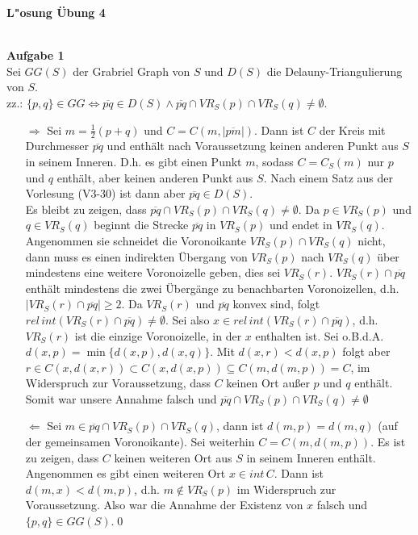 \documentclass{article}
\newcommand{\serie}{4}
\begin{document}
\begin{large}
\textbf{L"osung \"Ubung \serie}\\ \\
\end{large}
\textbf{Aufgabe 1}\\
Sei $GG(S)$ der Grabriel Graph von $S$ und $D(S)$ die Delauny-Triangulierung von $S$.\\
zz.: $\{p,q\}\in GG\Leftrightarrow \overline{pq} \in D(S) \wedge \overline{pq} \cap VR_S(p) \cap VR_S(q) \ne \emptyset$.\\
\begin{itemize}
\item[$\Rightarrow$] Sei $m=\frac{1}{2}(p+q)$ und $C=C(m,|\overline{pm}|)$. Dann ist $C$ der Kreis mit Durchmesser $\overline{pq}$ und enth\"alt nach Voraussetzung keinen anderen Punkt aus $S$ in seinem Inneren. D.h. es gibt einen Punkt $m$, sodass $C = C_S(m)$ nur $p$ und $q$ enth\"alt, aber keinen anderen Punkt aus $S$. Nach einem Satz aus der Vorlesung (V3-30) ist dann aber $\overline{pq}\in D(S)$.\\
Es bleibt zu zeigen, dass $\overline{pq} \cap VR_S(p) \cap VR_S(q) \ne \emptyset$. Da $p\in VR_S(p)$ und $q \in VR_S(q)$ beginnt die Strecke $\overline{pq}$ in $VR_S(p)$ und endet in $VR_S(q)$. Angenommen sie schneidet die Voronoikante $VR_S(p) \cap VR_S(q)$ nicht, dann muss es einen indirekten \"Ubergang von $VR_S(p)$ nach $VR_S(q)$ \"uber mindestens eine weitere Voronoizelle geben, dies sei $VR_S(r)$. $VR_S(r) \cap \overline{pq}$ enth\"alt mindestens die zwei \"Uberg\"ange zu benachbarten Voronoizellen, d.h. $|VR_S(r)\cap\overline{pq}|\geq 2$. Da $VR_S(r)$ und $\overline{pq}$ konvex sind, folgt $rel\,int(VR_S(r)\cap \overline{pq}) \ne \emptyset$. Sei also $x\in rel\,int(VR_S(r)\cap \overline{pq})$, d.h. $VR_S(r)$ ist die einzige Voronoizelle, in der $x$ enthalten ist. Sei o.B.d.A. $d(x,p) = \min\{d(x,p), d(x,q)\}$. Mit $d(x,r) < d(x,p)$ folgt aber $r \in C(x, d(x,r))\subset C(x,d(x,p)) \subseteq C(m,d(m,p)) = C$, im Widerspruch zur Voraussetzung, dass $C$ keinen Ort au\ss er $p$ und $q$ enth\"alt. Somit war unsere Annahme falsch und $\overline{pq} \cap VR_S(p) \cap VR_S(q) \ne \emptyset$
\item[$\Leftarrow$] Sei $m \in \overline{pq} \cap VR_S(p) \cap VR_S(q)$, dann ist $d(m,p)=d(m,q)$ (auf der gemeinsamen Voronoikante). Sei weiterhin $C=C(m, d(m,p))$. Es ist zu zeigen, dass $C$ keinen weiteren Ort aus $S$ in seinem Inneren enth\"alt. Angenommen es gibt einen weiteren Ort $x\in int\,C$. Dann ist $d(m,x)<d(m,p)$, d.h. $m\not\in VR_S(p)$ im Widerspruch zur Voraussetzung. Also war die Annahme der Existenz von $x$ falsch und $\{p,q\} \in GG(S)$.\qed
\end{itemize}
\end{document}

